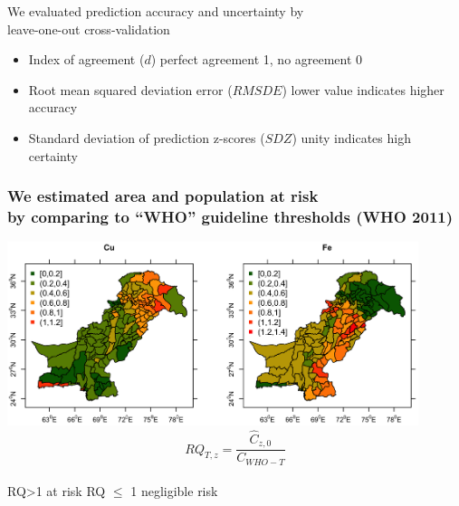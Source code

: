 \documentclass[10pt, compress]{beamer}
\begin{document}
\begin{frame}{We evaluated prediction accuracy and uncertainty by \protect\\ leave-one-out cross-validation}
      \begin{itemize}
        \item \alert{Index of agreement ($d$)} perfect agreement 1, no agreement 0
        \pause
        \item \alert{Root mean squared deviation error ($RMSDE$)} lower value indicates higher accuracy
        \pause
        \item \alert{Standard deviation of prediction z-scores ($SDZ$)} unity indicates high certainty
      \end{itemize}

\end{frame}

\begin{frame}[fragile]
  \frametitle{We estimated area and population at risk \protect\\ by comparing to ``WHO'' guideline thresholds \small{(WHO 2011)}}

  \centering
  \includegraphics[width=0.9\textwidth]{images/Prediction_example.png}
  \begin{equation*}
    RQ_{T,z} = \frac{\hat{C}_{z,0}}{C_{WHO-T}}
    \end{equation*}
    \pause \\
  \alert{RQ>1} at risk \alert{RQ $\leq$ 1} negligible risk
  
\end{frame}
\end{document}
